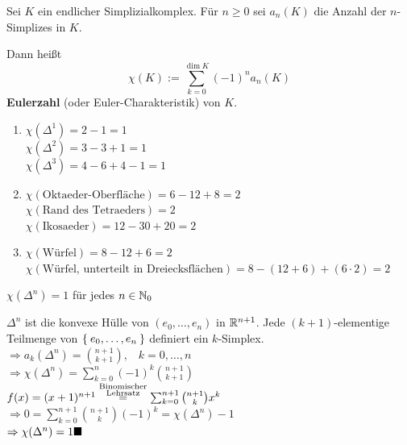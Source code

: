 \begin{definition}
    Sei $K$ ein endlicher Simplizialkomplex. Für $n \geq 0$ sei
    $a_n(K)$ die Anzahl der $n$-Simplizes in $K$.

    Dann heißt 
    \[\chi(K) := \sum_{k=0}^{\dim K} (-1)^n a_n(K)\]
    \textbf{Eulerzahl} (oder Euler-Charakteristik)
    von $K$.
\end{definition}

\begin{beispiel}
    \begin{enumerate}[label=\arabic*)]
        \item $\chi(\Delta^1) = 2 - 1 = 1$\\
              $\chi(\Delta^2) = 3 - 3 + 1 = 1$\\
              $\chi(\Delta^3) = 4 - 6 + 4 - 1 = 1$
        \item $\chi(\text{Oktaeder-Oberfläche}) = 6 - 12 + 8 = 2$\\
              $\chi(\text{Rand des Tetraeders}) = 2$\\
              $\chi(\text{Ikosaeder}) = 12 - 30 + 20 = 2$
        \item $\chi(\text{Würfel}) = 8 - 12 + 6 = 2$\\
              $\chi(\text{Würfel, unterteilt in Dreiecksflächen}) = 8 - (12 + 6) + (6 \cdot 2) = 2$
    \end{enumerate}
\end{beispiel}

\begin{korollar}
    $\chi(\Delta^n) = 1$ für jedes $n \in \mathbb{N}_0$
\end{korollar}

\begin{beweis}
    $\Delta^n$ ist die konvexe Hülle von $(e_0, \dots, e_n)$ in $\mathbb{R}^{n+1}$.
    Jede $(k+1)$-elementige Teilmenge von $\Set{e_0, \dots, e_n}$
    definiert ein $k$-Simplex.\\
    $\Rightarrow a_k(\Delta^n) = \binom{n+1}{k+1}, \;\;\; k = 0, \dots, n$\\
    $\Rightarrow \chi(\Delta^n) = \sum_{k=0}^n (-1)^k \binom{n+1}{k+1}$\\
    $f(x) = (x+1)^{n+1} \stackrel{\substack{\tiny\text{Binomischer}\\\text{Lehrsatz}}}{=} \sum_{k=0}^{n+1} \binom{n+1}{k} x^k$\\
    $\Rightarrow 0 = \sum_{k=0}^{n+1} \binom{n+1}{k} (-1)^k = \chi(\Delta^n) -1$\\
    $\Rightarrow \chi(\Delta^n) = 1 \qed$
\end{beweis}

